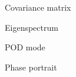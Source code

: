 \documentclass[aspectratio=169]{beamer}
\begin{document}
\begin{frame}
  \vfill

  \begin{minipage}{.48\textwidth}
    Covariance matrix
  \end{minipage}%
  \hfill
  \begin{minipage}{.48\textwidth}
    Eigenspectrum
  \end{minipage}

  \vfill
\end{frame}

\begin{frame}
  \vfill

  \begin{minipage}{.48\textwidth}
    POD mode
  \end{minipage}%
  \hfill
  \begin{minipage}{.48\textwidth}
    Phase portrait
  \end{minipage}

  \vfill
\end{frame}
\end{document}
